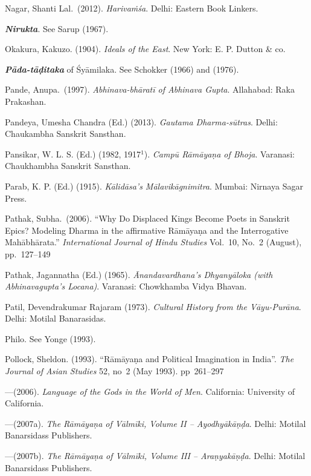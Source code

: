 \begin{thebibliography}{99}
Nagar, Shanti Lal.\ (2012). {\sl Harivaṁśa}. Delhi: Eastern Book Linkers. 

{\sl\bfseries Nirukta}. See Sarup (1967).

Okakura, Kakuzo. (1904). {\sl Ideals of the East}. New York: E. P. Dutton \& co. 

{\sl\bfseries Pāda-tāḍitaka} of Śyāmilaka. See Schokker (1966) and (1976).

Pande, Anupa.\ (1997). {\sl Abhinava-bhāratī of Abhinava Gupta}. Allahabad: Raka Prakashan. 

Pandeya, Umesha Chandra (Ed.) (2013). {\sl Gautama Dharma-sūtras}. Delhi: Chaukambha Sanskrit Sansthan. 

Pansikar, W. L. S. (Ed.) (1982, 1917$^{1}$). {\sl Campū Rāmāyaṇa of Bhoja}. Varanasi: Chaukhambha Sanskrit Sansthan.

Parab, K. P. (Ed.) (1915). {\sl Kālidāsa’s Mālavikāgnimitra}. Mumbai: Nirnaya Sagar Press. 

Pathak, Subha.\ (2006). “Why Do Displaced Kings Become Poets in Sanskrit Epics? Modeling Dharma in the affirmative Rāmāyaṇa and the Interrogative Mahābhārata.” {\sl International Journal of Hindu Studies} Vol.~10, No.~2 (August), pp.~127--149

Pathak, Jagannatha (Ed.) (1965). {\sl Ānandavardhana’s Dhyanyāloka (with Abhinavagupta’s Locana)}. Varanasi: Chowkhamba Vidya Bhavan. 

Patil, Devendrakumar Rajaram (1973). {\sl Cultural History from the Vāyu-Purāna}. Delhi: Motilal Banarasidas. 

Philo. See Yonge (1993).

Pollock, Sheldon. (1993). “Rāmāyaṇa and Political Imagination in India”. {\sl The Journal of Asian Studies} 52, no~2 (May 1993). pp~261--297

---\kern3pt(2006). {\sl Language of the Gods in the World of Men}. California: University of California. 

---\kern3pt(2007a). {\sl The Rāmāyaṇa of Vālmīki, Volume II – Ayodhyākāṇḍa}. Delhi: Motilal Banarsidass Publishers. 

---\kern3pt(2007b). {\sl The Rāmāyaṇa of Vālmīki, Volume III – Araṇyakāṇḍa}. Delhi: Motilal Banarsidass Publishers. 


\end{thebibliography}
